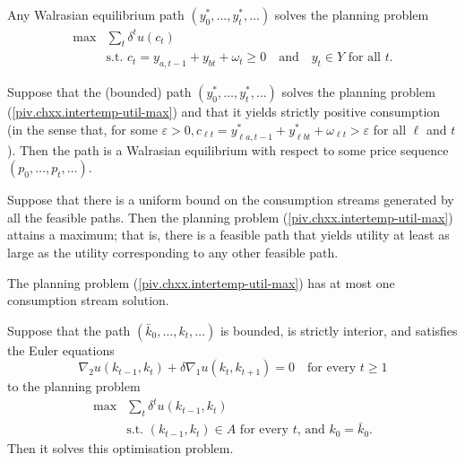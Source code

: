 \addtocounter{equation}{6}
\begin{prop}
    Any Walrasian equilibrium path $(y^*_0, \dots, y^*_t, \dots)$ solves the planning problem
    \begin{equation}\label{piv.chxx.intertemp-util-max}
        \begin{aligned}
            \max &\sum_t \delta^t u(c_t) \\
            &\text{s.t. } c_t = y_{a, t - 1} + y_{bt} + \omega_t \geq 0 \quad \text{and} \quad y_t \in Y \text{ for all } t.
        \end{aligned}
    \end{equation}
\end{prop}

\begin{prop}
    Suppose that the (bounded) path $(y^*_0, \dots, y^*_t, \dots)$ solves the planning problem (\ref{piv.chxx.intertemp-util-max}) and that it yields strictly positive consumption (in the sense that, for some $\varepsilon > 0, c_{\ell t} = y^*_{\ell a, t - 1} + y^*_{\ell bt} + \omega_{\ell t} > \varepsilon$ for all $\ell$ and $t$). Then the path is a Walrasian equilibrium with respect to some price sequence $(p_0, \dots, p_t, \dots)$.
\end{prop}

\begin{prop}
    Suppose that there is a uniform bound on the consumption streams generated by all the feasible paths. Then the planning problem (\ref{piv.chxx.intertemp-util-max}) attains a maximum; that is, there is a feasible path that yields utility at least as large as the utility corresponding to any other feasible path.
\end{prop}

\begin{prop}
    The planning problem (\ref{piv.chxx.intertemp-util-max}) has at most one consumption stream solution.
\end{prop}

\begin{prop}
    Suppose that the path $(\bar{k}_0, \dots, k_t, \dots)$ is bounded, is strictly interior, and satisfies the Euler equations
    \begin{equation*}
        \nabla_2 u(k_{t - 1}, k_t) + \delta \nabla_1 u(k_t, k_{t + 1}) = 0 \quad \text{for every } t \geq 1
    \end{equation*}
    to the planning problem
    \begin{equation*}
        \begin{aligned}
            \max &\sum_t \delta^t u(k_{t - 1}, k_t) \\
            &\text{s.t. } (k_{t - 1}, k_t) \in A \text{ for every } t \text{, and } k_0 = \bar{k}_0.
        \end{aligned}
    \end{equation*}
    Then it solves this optimisation problem.
\end{prop}


